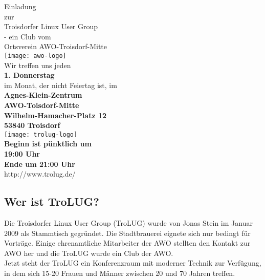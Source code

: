 \documentclass[a4paper,11pt,notumble]{leaflet}
\begin{document}
 
\newenvironment{pandora}{\fontfamily{pnb10}\selectfont}{}
\newenvironment{panfett}{\fontfamily{pnss10}\selectfont}{}
\newenvironment{ebmr}{\fontfamily{ebmr10}\selectfont}{}
\newenvironment{anb}{\fontfamily{anb10u}\selectfont}{}
\setlength{\fboxsep}{0.2cm}  %
\setlength{\parindent}{0pt}  %

\newcommand{\VT}[3]{{\tt #1} \textsl{#2} {\bf #3}\\[2mm]}



\begin{center}
\Huge{\sc Einladung}\\[3mm]
{\small zur}\\[1mm]
\large{\sc Troisdorfer Linux User Group}\\[1mm]
{\small - ein Club vom}\\[1mm]
\large{\sc Ortsverein AWO-Troisdorf-Mitte} \\[1mm] 
  \texttt{[image: awo-logo]}\\[5mm]
{\large Wir treffen uns jeden} \\[0mm]

  \textbf{\Huge{1. Donnerstag\\[2mm] }} %
  im Monat, der nicht Feiertag ist, im\\[5mm]
 \textbf{\sc Agnes-Klein-Zentrum\\[2mm]
AWO-Toisdorf-Mitte\\
Wilhelm-Hamacher-Platz 12\\
53840 Troisdorf\\[5mm]}
 \texttt{[image: trolug-logo]}\\[4mm]
\textbf{\large{Beginn ist pünktlich um\\[1mm]}}
\textbf{\Huge{19:00 Uhr}} \\[1mm]
\textbf{\large{Ende um 21:00 Uhr}}\\[2mm]
\textsf{\large http://www.trolug.de/ }\\[2mm]
\end{center}

\vfill
\subsection{Wer ist TroLUG?}
Die {\sc Troisdorfer Linux User Group} (TroLUG) wurde von Jonas Stein im Januar 2009 als Stammtisch gegründet. 
Die Stadtbrauerei eignete sich nur bedingt für Vorträge. Einige ehrenamtliche Mitarbeiter der AWO stellten den Kontakt zur AWO her und die TroLUG wurde ein Club der AWO.\\
Jetzt steht der TroLUG ein Konferenzraum mit moderner Technik zur Verfügung, in dem sich 15-20 Frauen und Männer zwischen 20 und 70 Jahren treffen.
\end{document}
